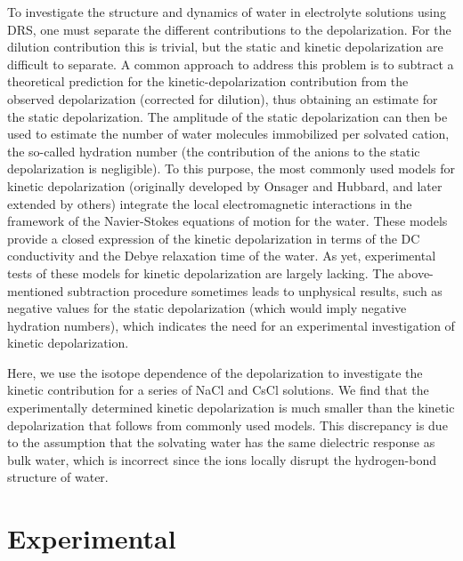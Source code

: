 To investigate the structure and dynamics of water in electrolyte solutions using DRS, one must separate the different contributions to the depolarization. For the dilution contribution this is trivial, but the static and kinetic depolarization are difficult to separate. A common approach to address this problem is to subtract a theoretical prediction for the kinetic-depolarization contribution from the observed depolarization (corrected for dilution), thus obtaining an estimate for the static depolarization. 
The amplitude of the static depolarization can then be used to estimate the number of water molecules immobilized per solvated cation, the so-called hydration number (the contribution of the anions to the static depolarization is negligible).\!\cite{Impey1983,Guardia1990,Barthel1992,Ohtaki1993,Smith1994,Buchner1999,Wachter2007,Buchner2008,Tielrooij2009,Ottosson2014c} To this purpose, the most commonly used models for kinetic depolarization (originally developed by Onsager and Hubbard,\!\cite{Hubbard1977a,Hubbard1977,Hubbard1978c} and later extended by others\!\cite{VanderZwan1982,VanderZwan1983a,Robinson2002}) integrate the local electromagnetic interactions in the framework of the Navier-Stokes equations of motion for the water. These models provide a closed expression of the kinetic depolarization in terms of the DC conductivity and the Debye relaxation time of the water. As yet, experimental tests of these models for kinetic depolarization are largely lacking. The above-mentioned subtraction procedure sometimes leads to unphysical results, such as negative values for the static depolarization\!\cite{Chen2003} (which would imply negative hydration numbers), which indicates the need for an experimental investigation of kinetic depolarization.



Here, we use the isotope dependence of the depolarization to investigate the kinetic contribution for a series of NaCl and CsCl solutions. We find that the experimentally determined kinetic depolarization is much smaller than the kinetic depolarization that follows from commonly used models. This discrepancy is due to the assumption that the solvating water has the same dielectric response as bulk water, which is incorrect since the ions locally disrupt the hydrogen-bond structure of water.\!\cite{Kay1966,Hertz1974,Hertz1976,Harris1978,Marcus2009,Bakker2009,Lin2009,Jungwirth2014a,Schienbein2017a} 


\section{Experimental}



